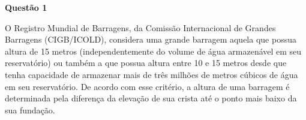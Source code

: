 \item[]\textbf{Questão 1}

\hspace{1cm}O Registro Mundial de Barragens, da Comissão Internacional de Grandes Barragens (CIGB/ICOLD), considera uma grande barragem aquela que possua altura de 15 metros (independentemente do volume de água armazenável em seu reservatório) ou também a que possua altura entre 10 e 15 metros desde que tenha capacidade de armazenar mais de três milhões de metros cúbicos de água em seu reservatório. De acordo com esse critério, a altura de uma barragem é determinada pela diferença da elevação de sua crista até o ponto mais baixo da sua fundação.
